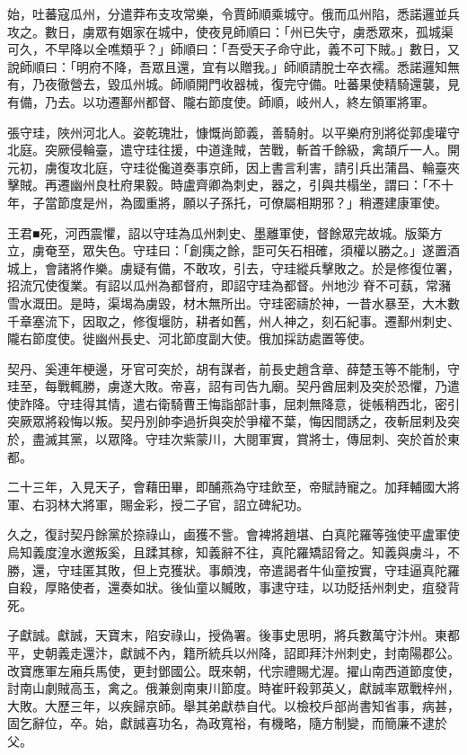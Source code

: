 \begin{pinyinscope}
 始，吐蕃寇瓜州，分遣莽布支攻常樂，令賈師順乘城守。俄而瓜州陷，悉諾邏並兵攻之。數日，虜眾有姻家在城中，使夜見師順曰：「州已失守，虜悉眾來，孤城渠可久，不早降以全噍類乎？」師順曰：「吾受天子命守此，義不可下賊。」數日，又說師順曰：「明府不降，吾眾且還，宜有以贈我。」師順請脫士卒衣襦。悉諾邏知無有，乃夜徹營去，毀瓜州城。師順開門收器械，復完守備。吐蕃果使精騎還襲，見有備，乃去。以功遷鄯州都督、隴右節度使。師順，岐州人，終左領軍將軍。



 張守珪，陜州河北人。姿乾瑰壯，慷慨尚節義，善騎射。以平樂府別將從郭虔瓘守北庭。突厥侵輪臺，遣守珪往援，中道逢賊，苦戰，斬首千餘級，禽頡斤一人。開元初，虜復攻北庭，守珪從儳道奏事京師，因上書言利害，請引兵出蒲昌、輪臺夾擊賊。再遷幽州良杜府果毅。時盧齊卿為刺史，器之，引與共榻坐，謂曰：「不十年，子當節度是州，為國重將，願以子孫托，可僚屬相期邪？」稍遷建康軍使。



 王君■死，河西震懼，詔以守珪為瓜州刺史、墨離軍使，督餘眾完故城。版築方立，虜奄至，眾失色。守珪曰：「創痍之餘，詎可矢石相確，須權以勝之。」遂置酒城上，會諸將作樂。虜疑有備，不敢攻，引去，守珪縱兵擊敗之。於是修復位署，招流冗使復業。有詔以瓜州為都督府，即詔守珪為都督。州地沙脊不可蓺，常瀦雪水溉田。是時，渠堨為虜毀，材木無所出。守珪密禱於神，一昔水暴至，大木數千章塞流下，因取之，修復堰防，耕者如舊，州人神之，刻石紀事。遷鄯州刺史、隴右節度使。徙幽州長史、河北節度副大使。俄加採訪處置等使。



 契丹、奚連年梗邊，牙官可突於，胡有謀者，前長史趙含章、薛楚玉等不能制，守珪至，每戰輒勝，虜遂大敗。帝喜，詔有司告九廟。契丹酋屈剌及突於恐懼，乃遣使詐降。守珪得其情，遣右衛騎曹王悔詣部計事，屈刺無降意，徙帳稍西北，密引突厥眾將殺悔以叛。契丹別帥李過折與突於爭權不葉，悔因間誘之，夜斬屈剌及突於，盡滅其黨，以眾降。守珪次紫蒙川，大閱軍實，賞將士，傳屈刺、突於首於東都。



 二十三年，入見天子，會藉田畢，即酺燕為守珪飲至，帝賦詩寵之。加拜輔國大將軍、右羽林大將軍，賜金彩，授二子官，詔立碑紀功。



 久之，復討契丹餘黨於捺祿山，鹵獲不訾。會裨將趙堪、白真陀羅等強使平盧軍使烏知義度湟水邀叛奚，且蹂其稼，知義辭不往，真陀羅矯詔脅之。知義與虜斗，不勝，還，守珪匿其敗，但上克獲狀。事頗洩，帝遣謁者牛仙童按實，守珪逼真陀羅自殺，厚賂使者，還奏如狀。後仙童以贓敗，事逮守珪，以功貶括州刺史，疽發背死。



 子獻誠。獻誠，天寶末，陷安祿山，授偽署。後事史思明，將兵數萬守汴州。東都平，史朝義走還汴，獻誠不內，籍所統兵以州降，詔即拜汴州刺史，封南陽郡公。改寶應軍左廂兵馬使，更封鄧國公。既來朝，代宗禮賜尤渥。擢山南西道節度使，討南山劇賊高玉，禽之。俄兼劍南東川節度。時崔旰殺郭英乂，獻誠率眾戰梓州，大敗。大歷三年，以疾歸京師。舉其弟獻恭自代。以檢校戶部尚書知省事，病甚，固乞辭位，卒。始，獻誠喜功名，為政寬裕，有機略，隨方制變，而簡廉不逮於父。




\end{pinyinscope}
